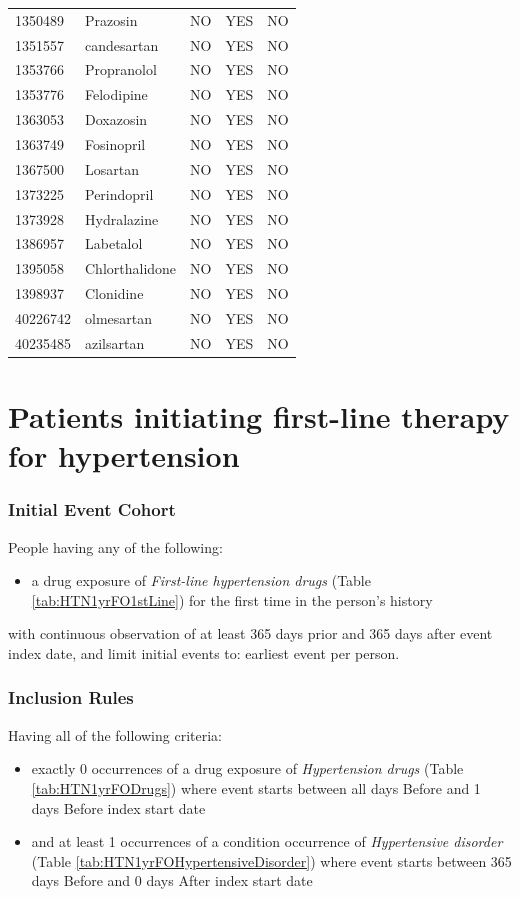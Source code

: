 \documentclass[11pt]{book}
\providecommand{\tightlist}{%
  \setlength{\itemsep}{0pt}\setlength{\parskip}{0pt}}
\theoremstyle{definition}
\theoremstyle{definition}
\theoremstyle{definition}
\theoremstyle{remark}
\begin{document}
\begin{longtable}[]{@{}lllll@{}}
1350489 & Prazosin & NO & YES & NO\tabularnewline
1351557 & candesartan & NO & YES & NO\tabularnewline
1353766 & Propranolol & NO & YES & NO\tabularnewline
1353776 & Felodipine & NO & YES & NO\tabularnewline
1363053 & Doxazosin & NO & YES & NO\tabularnewline
1363749 & Fosinopril & NO & YES & NO\tabularnewline
1367500 & Losartan & NO & YES & NO\tabularnewline
1373225 & Perindopril & NO & YES & NO\tabularnewline
1373928 & Hydralazine & NO & YES & NO\tabularnewline
1386957 & Labetalol & NO & YES & NO\tabularnewline
1395058 & Chlorthalidone & NO & YES & NO\tabularnewline
1398937 & Clonidine & NO & YES & NO\tabularnewline
40226742 & olmesartan & NO & YES & NO\tabularnewline
40235485 & azilsartan & NO & YES & NO\tabularnewline
\bottomrule
\end{longtable}

\hypertarget{HTN1yrFO}{%
\section{Patients initiating first-line therapy for hypertension}\label{HTN1yrFO}}

\hypertarget{initial-event-cohort-5}{%
\subsubsection*{Initial Event Cohort}\label{initial-event-cohort-5}}

People having any of the following:

\begin{itemize}
\tightlist
\item
  a drug exposure of \emph{First-line hypertension drugs} (Table \ref{tab:HTN1yrFO1stLine}) for the first time in the person's history
\end{itemize}

with continuous observation of at least 365 days prior and 365 days after event index date, and limit initial events to: earliest event per person.

\hypertarget{inclusion-rules-2}{%
\subsubsection*{Inclusion Rules}\label{inclusion-rules-2}}

Having all of the following criteria:

\begin{itemize}
\tightlist
\item
  exactly 0 occurrences of a drug exposure of \emph{Hypertension drugs} (Table \ref{tab:HTN1yrFODrugs}) where event starts between all days Before and 1 days Before index start date
\item
  and at least 1 occurrences of a condition occurrence of \emph{Hypertensive disorder} (Table \ref{tab:HTN1yrFOHypertensiveDisorder}) where event starts between 365 days Before and 0 days After index start date
\end{itemize}
\end{document}
